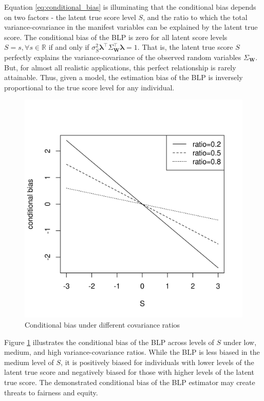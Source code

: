 \documentclass[man, floatsintext]{apa7}
\newcommand{\mbf}[1]{\bm{#1}}
\newcommand{\blambda}{\mbf{\lambda}}
\newcommand{\bW}{\mbf{W}}
\begin{document}
  Equation \ref{eq:conditional_bias} is illuminating that the conditional bias
  depends on two factors - the latent true score level $S$, and the ratio to
  which the total variance-covariance in the manifest variables can be explained
  by the latent true score. The conditional bias of the BLP is zero for all
  latent score levels $S = s, \forall s \in \mathbb{R}$ if and only if
  $\sigma_S^2\blambda^\top\Sigma_{\bW}^\top\blambda = 1$. That is, the latent
  true score $S$ perfectly explains the variance-covariance of the observed
  random variables $\Sigma_{\bW}$. But, for almost all realistic applications,
  this perfect relationship is rarely attainable. Thus, given a model, the
  estimation bias of the BLP is inversely proportional to the true score level
  for any individual.
  \begin{figure}[t]
  \centering
    \includegraphics[scale = 0.65]{fig/conditional_bias.png}
    \caption{Conditional bias under different covariance ratios}
    \label{fig:conditional bias}
  \end{figure}
  Figure \ref{fig:conditional bias} illustrates the conditional bias of the
  BLP across levels of $S$ under low, medium, and high variance-covariance
  ratios. While the BLP is less biased in the medium level of $S$, it is
  positively biased for individuals with lower levels of the latent true score
  and negatively biased for those with higher levels of the latent true score.
  The demonstrated conditional bias of the BLP estimator may create threats to
  fairness and equity.
\end{document}
